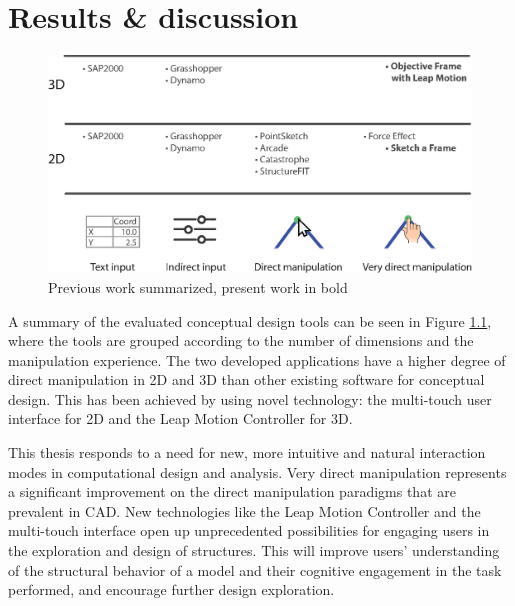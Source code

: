 \chapter{Results \& discussion}
\label{ch:Results discussion}
\begin{figure}
  \includegraphics[width=330pt]{graphics/softwareReview.eps}
  \caption{Previous work summarized, present work in bold}
  \label{fig:softwareReview}
\end{figure}

A summary of the evaluated conceptual design tools can be seen in Figure \ref{fig:softwareReview}, where the tools are grouped according to the number of dimensions and the manipulation experience. The two developed applications have a higher degree of direct manipulation in 2D and 3D than other existing software for conceptual design. This has been achieved by using novel technology: the multi-touch user interface for 2D and the Leap Motion Controller for 3D.

This thesis responds to a need for new, more intuitive and natural interaction modes in computational design and analysis. Very direct manipulation represents a significant improvement on the direct manipulation paradigms that are prevalent in CAD. New technologies like the Leap Motion Controller and the multi-touch interface open up unprecedented possibilities for engaging users in the exploration and design of structures. This will improve users’ understanding of the structural behavior of a model and their cognitive engagement in the task performed, and encourage further design exploration.


